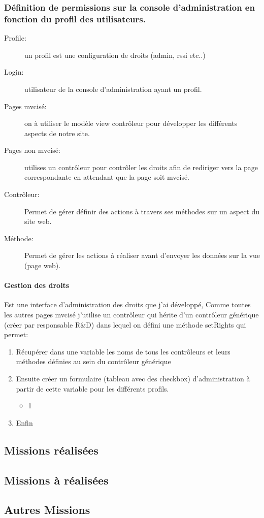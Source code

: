 \subsubsection{Définition de permissions sur la console d'administration en fonction du profil des utilisateurs.}
\begin{description}


\item[Profile:] un profil est une configuration de droits (admin, rssi etc..)

\item[Login:] utilisateur de la console d’administration ayant un profil.

\item[Pages mvcisé:] on à utiliser le modèle view contrôleur pour développer les différents aspects de notre site.

\item[Pages non mvcisé:] utilises un contrôleur pour contrôler les droits afin de rediriger vers la page correspondante en attendant que la page soit mvcisé.

\item[Contrôleur:] Permet de gérer définir des actions à travers ses méthodes sur un aspect du site web.

\item[Méthode:] Permet de gérer les actions à réaliser avant d'envoyer les données sur la vue (page web).
\end{description}

\paragraph{Gestion des droits}
Est une interface d'administration des droits que j'ai développé,
Comme toutes les autres pages mvcisé j'utilise un contrôleur qui hérite d'un contrôleur générique (créer par responsable R\&D) dans lequel on défini une méthode setRights qui permet:
\begin{enumerate}


\item Récupérer dans une variable les noms de tous les contrôleurs et leurs méthodes définies au sein du contrôleur générique
\item Ensuite créer un formulaire (tableau avec des checkbox) d'administration à partir de cette variable pour les différents profils.
	\begin{itemize}
	\item 1
	\end{itemize}
\item Enfin
\end{enumerate}

\subsection{Missions réalisées}

\subsection{Missions à réalisées}

\subsection{Autres Missions}





